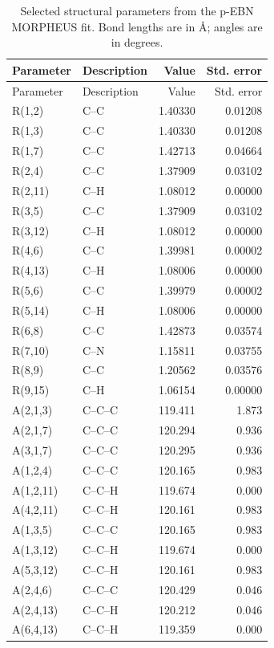 \begin{longtable}{llrr}
\caption{Selected structural parameters from the p-EBN MORPHEUS fit. Bond lengths are in \AA; angles are in degrees.}\label{tab:si-p-ebn-geometry}\\
\toprule
Parameter & Description & Value & Std. error \\
\midrule
\endfirsthead
\toprule
Parameter & Description & Value & Std. error \\
\midrule
\endhead
R(1,2) & C--C & 1.40330 & 0.01208 \\
R(1,3) & C--C & 1.40330 & 0.01208 \\
R(1,7) & C--C & 1.42713 & 0.04664 \\
R(2,4) & C--C & 1.37909 & 0.03102 \\
R(2,11) & C--H & 1.08012 & 0.00000 \\
R(3,5) & C--C & 1.37909 & 0.03102 \\
R(3,12) & C--H & 1.08012 & 0.00000 \\
R(4,6) & C--C & 1.39981 & 0.00002 \\
R(4,13) & C--H & 1.08006 & 0.00000 \\
R(5,6) & C--C & 1.39979 & 0.00002 \\
R(5,14) & C--H & 1.08006 & 0.00000 \\
R(6,8) & C--C & 1.42873 & 0.03574 \\
R(7,10) & C--N & 1.15811 & 0.03755 \\
R(8,9) & C--C & 1.20562 & 0.03576 \\
R(9,15) & C--H & 1.06154 & 0.00000 \\
A(2,1,3) & C--C--C & 119.411 & 1.873 \\
A(2,1,7) & C--C--C & 120.294 & 0.936 \\
A(3,1,7) & C--C--C & 120.295 & 0.936 \\
A(1,2,4) & C--C--C & 120.165 & 0.983 \\
A(1,2,11) & C--C--H & 119.674 & 0.000 \\
A(4,2,11) & C--C--H & 120.161 & 0.983 \\
A(1,3,5) & C--C--C & 120.165 & 0.983 \\
A(1,3,12) & C--C--H & 119.674 & 0.000 \\
A(5,3,12) & C--C--H & 120.161 & 0.983 \\
A(2,4,6) & C--C--C & 120.429 & 0.046 \\
A(2,4,13) & C--C--H & 120.212 & 0.046 \\
A(6,4,13) & C--C--H & 119.359 & 0.000 \\

\end{longtable}
